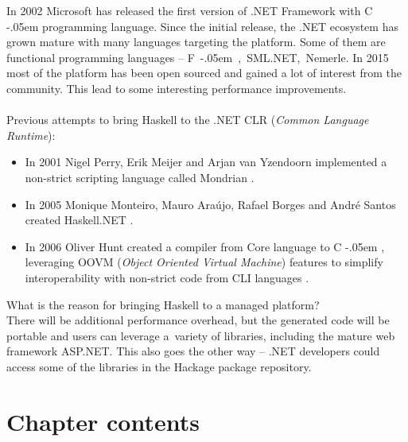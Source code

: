 \documentclass[en]{pracamgr}
\newcommand{\shrp}{%
  {\settoheight{\dimen0}{C}\kern-.05em \resizebox{!}{\dimen0}{\raisebox{\depth}{\textbf{\#}}}\hspace{1ex}}}
\begin{document}
In 2002 Microsoft has released the first version of .NET Framework with
C\shrp programming language. Since the initial release, the .NET ecosystem
has grown mature with many languages targeting the platform. 
Some of them are functional programming languages -- \mbox{F\shrp, SML.NET, Nemerle}.
In 2015 most of the platform has been open sourced and gained a lot of
interest from the community. This lead to some interesting performance
improvements.\\ \\
Previous attempts to bring
Haskell to the .NET CLR (\textit{Common Language Runtime}):
\begin{itemize}
  \item
  In 2001 Nigel Perry, Erik Meijer and Arjan van Yzendoorn implemented a 
  non-strict scripting language called Mondrian
  \cite{MondrianImplDetails}\cite{PerryMeijer}.
  
  \item
  In 2005 Monique Monteiro, Mauro Ara\'ujo, Rafael Borges and Andr\'e Santos
  created Haskell.NET
  \cite{Brazil}.

  \item
  In 2006 Oliver Hunt created a compiler from Core language to C\shrp, leveraging
  OOVM (\textit{Object Oriented Virtual Machine}) features to simplify interoperability
  with non-strict code from CLI languages \cite{Hunt}.
\end{itemize}

What is the reason for bringing Haskell to a managed platform?\\There will be
additional performance overhead, but the generated code will be portable
and users can leverage a~variety of libraries, including the mature web framework
ASP.NET. This also goes the other way -- .NET developers could access some of
the libraries in the Hackage package repository.

\section*{Chapter contents}
\end{document}
